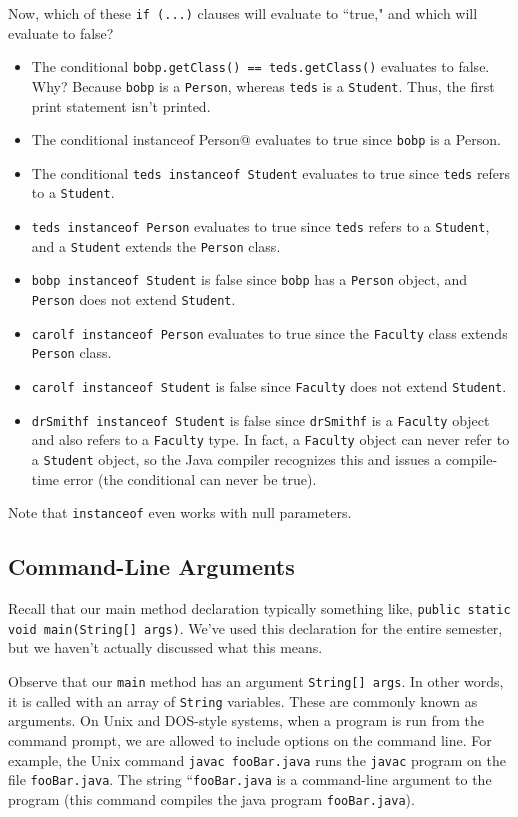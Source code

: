 Now, which of these \verb!if (...)! clauses will evaluate to ``true," and which will evaluate to false? 
\begin{itemize}
    \item The conditional \verb!bobp.getClass() == teds.getClass()! evaluates to false. Why? Because \verb!bobp! is a \verb!Person!, whereas \verb!teds! is a  \verb!Student!. Thus, the first print statement isn't printed.
    \item The conditional \verb@bobp instanceof Person@ evaluates to true since \verb!bobp! is a Person.
    \item The conditional \verb!teds instanceof Student! evaluates to true since \verb!teds! refers to a \verb!Student!.
    \item \verb!teds instanceof Person! evaluates to true since \verb!teds! refers to a \verb!Student!, and a \verb!Student! extends the \verb!Person! class.
    \item \verb!bobp instanceof Student! is false since \verb!bobp! has a \verb!Person! object, and \verb!Person! does not extend \verb!Student!.
    \item \verb!carolf instanceof Person! evaluates to true since the \verb!Faculty! class extends \verb!Person! class. 
    \item \verb!carolf instanceof Student! is false since \verb!Faculty! does not extend \verb!Student!.
    \item \verb!drSmithf instanceof Student! is false since \verb!drSmithf! is a \verb!Faculty! object and also refers to a \verb!Faculty! type. In fact, a \verb!Faculty! object can never refer to a \verb!Student! object, so the Java compiler recognizes this and issues a compile-time error (the conditional can never be true).
\end{itemize}

Note that \verb!instanceof! even works with null parameters. \\

\subsection{Command-Line Arguments}
Recall that our main method declaration typically something like, \verb!public static void main(String[] args)!. We've used this declaration for the entire semester, but we haven't actually discussed what this means.

Observe that our \verb!main! method has an argument \verb!String[] args!. In other words, it is called with an array of \verb!String! variables. These are commonly known as  arguments. On Unix and DOS-style systems, when a program is run from the command prompt, we are allowed to include options on the command line. For example, the Unix command \verb!javac fooBar.java! runs the \verb!javac! program on the file \verb!fooBar.java!. The string ``\verb!fooBar.java! is a command-line argument to the program (this command compiles the java program \verb!fooBar.java!). \\

